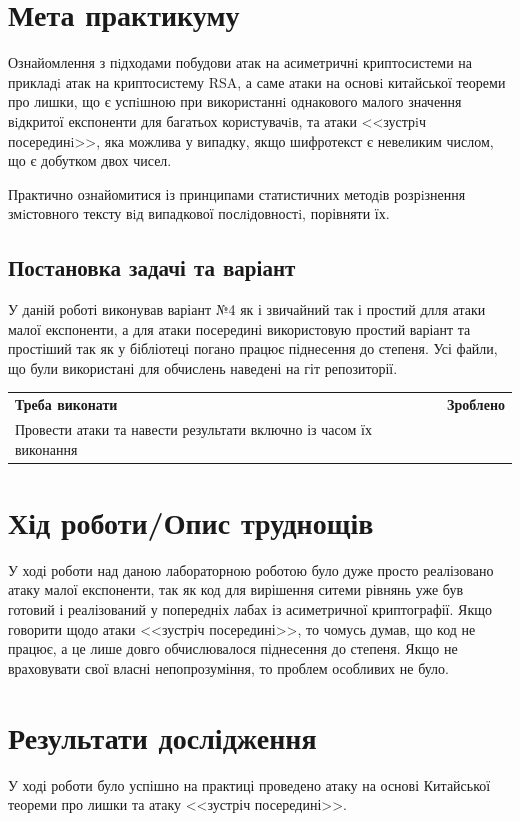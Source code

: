 \section{Мета практикуму}

Ознайомлення з пiдходами побудови атак на асиметричнi криптосистеми на прикладi атак на криптосистему RSA, а саме атаки на основi китайської теореми про лишки, що є успiшною при використаннi однакового малого  значення вiдкритої експоненти для багатьох користувачiв, та атаки <<зустрiч посерединi>>, яка можлива у випадку, якщо шифротекст є невеликим числом, що є добутком двох чисел.

Практично ознайомитися із принципами статистичних методiв розрiзнення змiстовного тексту вiд випадкової послiдовностi, порівняти їх.

\subsection{Постановка задачі та варіант}
У даній роботі виконував варіант №4 як і звичайний так і простий длля атаки малої експоненти, а для атаки посередині використовую простий варіант та простіший так як у бібліотеці погано працює піднесення до степеня. Усі файли, що були використані для обчислень наведені на гіт репозиторії.


\begin{tabularx}{\textwidth}{X|X}
	\textbf{Треба виконати} & \textbf{Зроблено} \\
	Провести атаки та навести результати включно із часом їх виконання & \checkmark \\
\end{tabularx}


\section{Хід роботи/Опис труднощів}
    У ході роботи над даною лабораторною роботою було дуже просто реалізовано атаку малої експоненти, так як код для вирішення ситеми рівнянь уже був готовий і реалізований у попередніх лабах із асиметричної криптографії. Якщо говорити щодо атаки <<зустріч посередині>>, то чомусь думав, що код не працює, а це лише довго обчислювалося піднесення до степеня. Якщо не враховувати свої власні непопрозуміння, то проблем особливих не було.

\section{Результати дослідження}
У ході роботи було успішно на практиці проведено атаку на основі Китайської теореми про лишки та атаку <<зустріч посередині>>.

